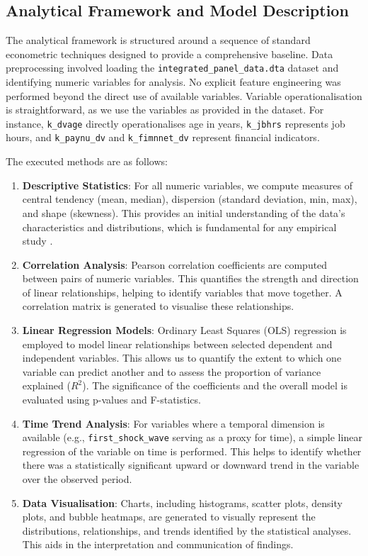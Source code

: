 \documentclass[11pt,a4paper]{article}
\begin{document}
\subsection{Analytical Framework and Model Description}

The analytical framework is structured around a sequence of standard econometric techniques designed to provide a comprehensive baseline. Data preprocessing involved loading the \texttt{integrated\_panel\_data.dta} dataset and identifying numeric variables for analysis. No explicit feature engineering was performed beyond the direct use of available variables. Variable operationalisation is straightforward, as we use the variables as provided in the dataset. For instance, \texttt{k\_dvage} directly operationalises age in years, \texttt{k\_jbhrs} represents job hours, and \texttt{k\_paynu\_dv} and \texttt{k\_fimnnet\_dv} represent financial indicators.

The executed methods are as follows:
\begin{enumerate}
    \item \textbf{Descriptive Statistics}: For all numeric variables, we compute measures of central tendency (mean, median), dispersion (standard deviation, min, max), and shape (skewness). This provides an initial understanding of the data's characteristics and distributions, which is fundamental for any empirical study \cite{ref4}.
    \item \textbf{Correlation Analysis}: Pearson correlation coefficients are computed between pairs of numeric variables. This quantifies the strength and direction of linear relationships, helping to identify variables that move together. A correlation matrix is generated to visualise these relationships.
    \item \textbf{Linear Regression Models}: Ordinary Least Squares (OLS) regression is employed to model linear relationships between selected dependent and independent variables. This allows us to quantify the extent to which one variable can predict another and to assess the proportion of variance explained ($R^2$). The significance of the coefficients and the overall model is evaluated using p-values and F-statistics.
    \item \textbf{Time Trend Analysis}: For variables where a temporal dimension is available (e.g., \texttt{first\_shock\_wave} serving as a proxy for time), a simple linear regression of the variable on time is performed. This helps to identify whether there was a statistically significant upward or downward trend in the variable over the observed period.
    \item \textbf{Data Visualisation}: Charts, including histograms, scatter plots, density plots, and bubble heatmaps, are generated to visually represent the distributions, relationships, and trends identified by the statistical analyses. This aids in the interpretation and communication of findings.
\end{enumerate}
\end{document}
